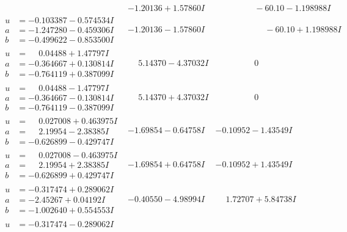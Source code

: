 \documentclass[1p]{elsarticle_modified}
\theoremstyle{definition}
\begin{document}
$$\begin{array}{c|c|c}
 & -1.20136 + 1.57860 I & \phantom{-0.000000 }      -6
0. 10   - 1.198988 I \\ \hline\begin{aligned}
u &= -0.103387 - 0.574534 I \\
a &= -1.247280 - 0.459306 I \\
b &= -0.499622 - 0.853500 I\end{aligned}
 & -1.20136 - 1.57860 I & \phantom{-0.000000 -}     -6
0. 10   + 1.198988 I \\ \hline\begin{aligned}
u &= \phantom{-}0.04488 + 1.47797 I \\
a &= -0.364667 + 0.130814 I \\
b &= -0.764119 + 0.387099 I\end{aligned}
 & \phantom{-}5.14370 - 4.37032 I & \phantom{-0.000000 } 0 \\ \hline\begin{aligned}
u &= \phantom{-}0.04488 - 1.47797 I \\
a &= -0.364667 - 0.130814 I \\
b &= -0.764119 - 0.387099 I\end{aligned}
 & \phantom{-}5.14370 + 4.37032 I & \phantom{-0.000000 } 0 \\ \hline\begin{aligned}
u &= \phantom{-}0.027008 + 0.463975 I \\
a &= \phantom{-}2.19954 - 2.38385 I \\
b &= -0.626899 - 0.429747 I\end{aligned}
 & -1.69854 - 0.64758 I & -0.10952 - 1.43549 I \\ \hline\begin{aligned}
u &= \phantom{-}0.027008 - 0.463975 I \\
a &= \phantom{-}2.19954 + 2.38385 I \\
b &= -0.626899 + 0.429747 I\end{aligned}
 & -1.69854 + 0.64758 I & -0.10952 + 1.43549 I \\ \hline\begin{aligned}
u &= -0.317474 + 0.289062 I \\
a &= -2.45267 + 0.04192 I \\
b &= -1.002640 + 0.554553 I\end{aligned}
 & -0.40550 - 4.98994 I & \phantom{-}1.72707 + 5.84738 I \\ \hline\begin{aligned}
u &= -0.317474 - 0.289062 I \\

\end{aligned}
\end{array}$$
\end{document}

